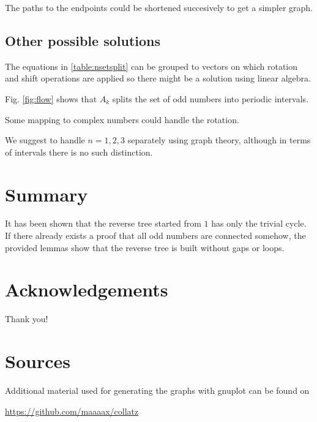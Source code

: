 \documentclass[10pt,a4paper]{article}
\begin{document}
The paths to the endpoints could be shortened succesively to get a simpler graph.

\subsection{Other possible solutions}
\begin{asparaitem}
\item The equations in \ref{table:nsetsplit} can be grouped to vectors on which rotation and shift operations are applied so there might be a solution using linear algebra.
\item Fig. \ref{fig:flow} shows that $A_k$ splits the set of odd numbers into periodic intervals. 
\item Some mapping to complex numbers could handle the rotation.
\end{asparaitem}

We suggest to handle $n=1,2,3$ separately using graph theory, although in terms of intervals there is no such distinction.
\section{Summary}
It has been shown that the reverse tree started from $1$ has only the trivial cycle. If there already exists a proof that all odd numbers are connected somehow, the provided lemmas show that the reverse tree is built without gaps or loops.

\section{Acknowledgements}
Thank you!

\section{Sources}
Additional material used for generating the graphs with gnuplot can be found on

\url{https://github.com/maaaax/collatz}
\end{document}
